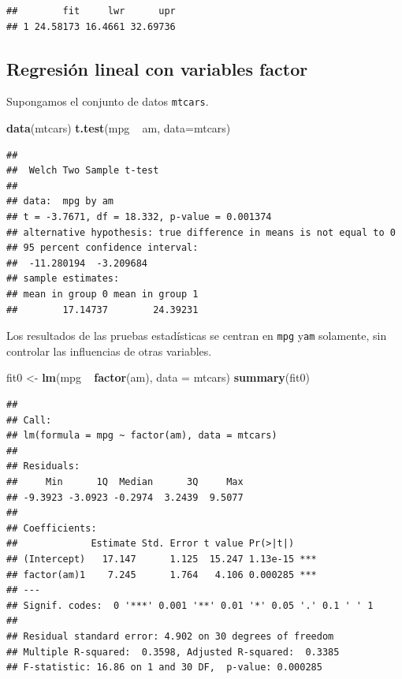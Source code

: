 \documentclass[]{article}
\newenvironment{Shaded}{\begin{snugshade}}{\end{snugshade}}
\newcommand{\KeywordTok}[1]{\textcolor[rgb]{0.13,0.29,0.53}{\textbf{{#1}}}}
\newcommand{\DataTypeTok}[1]{\textcolor[rgb]{0.13,0.29,0.53}{{#1}}}
\newcommand{\StringTok}[1]{\textcolor[rgb]{0.31,0.60,0.02}{{#1}}}
\newcommand{\NormalTok}[1]{{#1}}
\numberwithin{equation}{section}
\begin{document}
\begin{verbatim}
##        fit     lwr      upr
## 1 24.58173 16.4661 32.69736
\end{verbatim}

\subsection{Regresión lineal con variables
factor}\label{regresion-lineal-con-variables-factor}

Supongamos el conjunto de datos \texttt{mtcars}.

\begin{Shaded}
\begin{Highlighting}[]
\KeywordTok{data}\NormalTok{(mtcars)}
\KeywordTok{t.test}\NormalTok{(mpg ~}\StringTok{ }\NormalTok{am, }\DataTypeTok{data=}\NormalTok{mtcars) }
\end{Highlighting}
\end{Shaded}

\begin{verbatim}
## 
##  Welch Two Sample t-test
## 
## data:  mpg by am
## t = -3.7671, df = 18.332, p-value = 0.001374
## alternative hypothesis: true difference in means is not equal to 0
## 95 percent confidence interval:
##  -11.280194  -3.209684
## sample estimates:
## mean in group 0 mean in group 1 
##        17.14737        24.39231
\end{verbatim}

Los resultados de las pruebas estadísticas se centran en \texttt{mpg}
y\texttt{am} solamente, sin controlar las influencias de otras
variables.

\begin{Shaded}
\begin{Highlighting}[]
\NormalTok{fit0 <-}\StringTok{ }\KeywordTok{lm}\NormalTok{(mpg ~}\StringTok{ }\KeywordTok{factor}\NormalTok{(am), }\DataTypeTok{data =} \NormalTok{mtcars)}
\KeywordTok{summary}\NormalTok{(fit0)}
\end{Highlighting}
\end{Shaded}

\begin{verbatim}
## 
## Call:
## lm(formula = mpg ~ factor(am), data = mtcars)
## 
## Residuals:
##     Min      1Q  Median      3Q     Max 
## -9.3923 -3.0923 -0.2974  3.2439  9.5077 
## 
## Coefficients:
##             Estimate Std. Error t value Pr(>|t|)    
## (Intercept)   17.147      1.125  15.247 1.13e-15 ***
## factor(am)1    7.245      1.764   4.106 0.000285 ***
## ---
## Signif. codes:  0 '***' 0.001 '**' 0.01 '*' 0.05 '.' 0.1 ' ' 1
## 
## Residual standard error: 4.902 on 30 degrees of freedom
## Multiple R-squared:  0.3598, Adjusted R-squared:  0.3385 
## F-statistic: 16.86 on 1 and 30 DF,  p-value: 0.000285
\end{verbatim}
\end{document}
